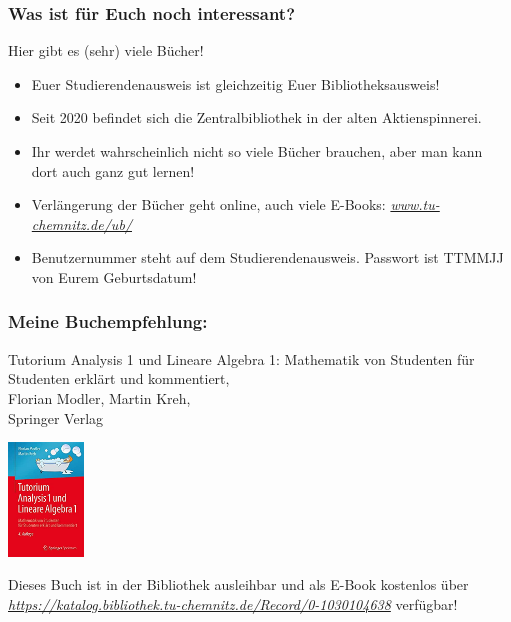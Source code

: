 \documentclass[10pt]{beamer}
\makeatletter
\newcommand{\highl}[1]{\color{tuccolor@ma}#1\color{black}}
\makeatother
\begin{document}
\begin{frame}
	\frametitle{Was ist für Euch noch interessant?}

	\begin{block}{\vphantom{X}}
		Hier gibt es (sehr) viele Bücher!
	\end{block}

	\begin{itemize}
		\item Euer Studierendenausweis ist gleichzeitig Euer Bibliotheksausweis!
		\item Seit 2020 befindet sich die Zentralbibliothek in der alten Aktienspinnerei. 
		\item Ihr werdet wahrscheinlich nicht so viele Bücher brauchen, aber man kann dort auch ganz gut lernen!
		\item Verlängerung der Bücher geht online, auch viele E-Books: \highl{\textit{\href{https://www.tu-chemnitz.de/ub/}{www.tu-chemnitz.de/ub/}}}
		\item Benutzernummer steht auf dem Studierendenausweis. Passwort ist TTMMJJ von Eurem Geburtsdatum!
	\end{itemize}
\end{frame}

\begin{frame}
	\frametitle{Meine Buchempfehlung:}

	Tutorium Analysis 1 und Lineare Algebra 1: Mathematik von Studenten für Studenten erklärt und kommentiert, \\
	Florian Modler, Martin Kreh, \\
	Springer Verlag 

	\begin{center}
		\includegraphics[width=2cm]{bilder/Buch.jpg}
	\end{center}

	Dieses Buch ist in der Bibliothek ausleihbar und als E-Book kostenlos über \highl{\textit{\href{https://katalog.bibliothek.tu-chemnitz.de/Record/0-1030104638}{https://katalog.bibliothek.tu-chemnitz.de/Record/0-1030104638}}} verfügbar!
\end{frame}
\end{document}
